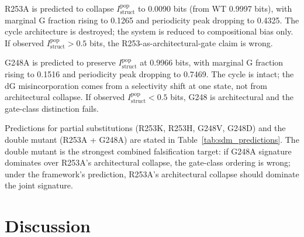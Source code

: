 \documentclass[aps,prx,reprint,amsmath,amssymb,floatfix,superscriptaddress,nofootinbib]{revtex4-2}
\theoremstyle{plain-thm}
\theoremstyle{definition-thm}
\newcommand{\Istructpop}{I_{\mathrm{struct}}^{\mathrm{pop}}}
\begin{document}
R253A is predicted to collapse $\Istructpop$ to 0.0090 bits (from WT 0.9997 bits), with marginal G fraction rising to 0.1265 and periodicity peak dropping to 0.4325. The cycle architecture is destroyed; the system is reduced to compositional bias only. If observed $\Istructpop > 0.5$ bits, the R253-as-architectural-gate claim is wrong.

G248A is predicted to preserve $\Istructpop$ at 0.9966 bits, with marginal G fraction rising to 0.1516 and periodicity peak dropping to 0.7469. The cycle is intact; the dG misincorporation comes from a selectivity shift at one state, not from architectural collapse. If observed $\Istructpop < 0.5$ bits, G248 is architectural and the gate-class distinction fails.

Predictions for partial substitutions (R253K, R253H, G248V, G248D) and the double mutant (R253A + G248A) are stated in Table~\ref{tab:sdm_predictions}. The double mutant is the strongest combined falsification target: if G248A signature dominates over R253A's architectural collapse, the gate-class ordering is wrong; under the framework's prediction, R253A's architectural collapse should dominate the joint signature.


\section{Discussion}
\end{document}

